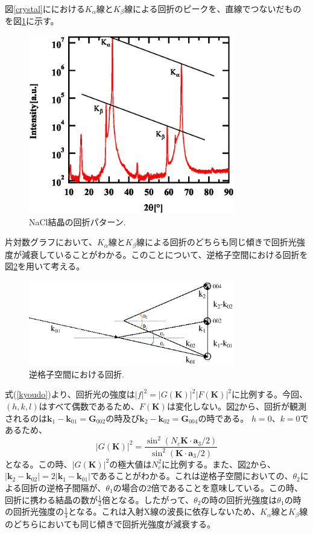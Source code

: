 \documentclass[11pt,a4j,uplatex]{jsarticle}
\begin{document}
図\ref{crystal}ににおける$K_\alpha$線と$K_\beta$線による回折のピークを、直線でつないだものを図\ref{kakb}に示す。

 \begin{figure}[htb]
  \centering
  \includegraphics[clip,width=9cm]{kakb.eps}
  \caption{NaCl結晶の回折パターン.}
  \label{kakb}
 \end{figure}

片対数グラフにおいて、$K_\alpha$線と$K_\beta$線による回折のどちらも同じ傾きで回折光強度が減衰していることがわかる。このことについて、逆格子空間における回折を図\ref{laue2}を用いて考える。

\begin{figure}[htb]
 \centering
 \includegraphics[clip,width=9cm]{laue2.eps}
 \caption{逆格子空間における回折.}
 \label{laue2}
\end{figure}

\newpage
式(\ref{kyoudo})より、回折光の強度は${|f|}^2={|G\bm{(K)}|^2}{|F\bm{(K)}|^2}$に比例する。今回、$(h,k,l)$はすべて偶数であるため、$F\bm{(K)}$は変化しない。図\ref{laue2}から、回折が観測されるのは$\bm{k}_1-\bm{k}_{01}=\bm{G}_{002}$の時及び$\bm{k}_2-\bm{k}_{02}=\bm{G}_{004}$の時である。
$h=0、k=0$であるため、
\begin{equation}
  |G(\bm{K})|^2=\frac{\sin^2(N_c\bm{K}\cdot\bm{a}_3/2)}{\sin^2(\bm{K}\cdot\bm{a}_3/2)}
\end{equation}
となる。この時、$|G(\bm{K})|^2$の極大値は$N_c^2$に比例する。また、図\ref{laue2}から、$|\bm{k}_2-\bm{k}_02|=2|\bm{k}_1-\bm{k}_01|$であることがわかる。これは逆格子空間においての、$\theta_2$による回折の逆格子間隔が、$\theta_1$の場合の2倍であることを意味している。この時、回折に携わる結晶の数が$\frac{1}{2}$倍となる。したがって、$\theta_2$の時の回折光強度は$\theta_1$の時の回折光強度の$\frac{1}{4}$となる。これは入射X線の波長に依存しないため、$K_\alpha$線と$K_\beta$線のどちらにおいても同じ傾きで回折光強度が減衰する。
\newpage
\end{document}
